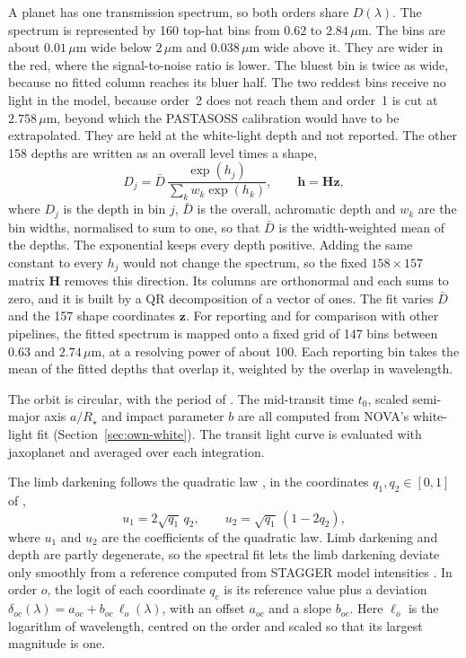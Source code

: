 A planet has one transmission spectrum, so both orders share $D(\lambda)$. The spectrum
is represented by 160 top-hat bins from 0.62 to $2.84\,\mu\mathrm{m}$. The bins
are about $0.01\,\mu\mathrm{m}$ wide below $2\,\mu\mathrm{m}$ and
$0.038\,\mu\mathrm{m}$ wide above it. They are wider in the red, where the
signal-to-noise ratio is lower. The bluest bin is twice as wide, because no fitted column reaches its
bluer half. The two reddest bins receive no light in the model, because order~2 does
not reach them and order~1 is cut at $2.758\,\mu\mathrm{m}$, beyond which the PASTASOSS calibration would have to be extrapolated. They are held at
the white-light depth and not reported. The other 158 depths are written as an
overall level times a shape,
\begin{equation}
  D_j = \bar D\,
  \frac{\exp(h_j)}{\sum_{k} w_k \exp(h_k)}, \qquad \bm{h}=\bm{H}\bm{z},
  \label{eq:depth-basis}
\end{equation}
where $D_j$ is the depth in bin $j$, $\bar D$ is the overall, achromatic depth and $w_k$ are the bin widths,
normalised to sum to one, so that $\bar D$ is the width-weighted mean of the
depths. The exponential keeps every depth positive. Adding the same constant to
every $h_j$ would not change the spectrum, so the fixed $158\times157$ matrix
$\bm{H}$ removes this direction. Its columns are orthonormal and each sums to
zero, and it is built by a QR decomposition of a vector of ones. The fit
varies $\bar D$ and the 157 shape coordinates $\bm{z}$. For reporting and for
comparison with other pipelines, the fitted spectrum is mapped onto a fixed
grid of 147 bins between 0.63 and $2.74\,\mu\mathrm{m}$, at a resolving power
of about 100. Each reporting bin takes the mean of the fitted depths that
overlap it, weighted by the overlap in wavelength.

The orbit is circular, with the period of \citet{LouieEtAl2025}. The
mid-transit time $t_0$, scaled semi-major axis $a/R_\star$ and impact
parameter $b$ are all computed from NOVA's white-light fit
(Section~\ref{sec:own-white}). The
transit light curve is evaluated with jaxoplanet \citep{Jaxoplanet2025} and averaged over
each integration.

The limb darkening follows the quadratic law \citep{MandelAgol2002}, in the
coordinates $q_1,q_2\in[0,1]$ of \citet{Kipping2013},
\begin{equation}
 u_1=2\sqrt{q_1}\,q_2, \qquad
 u_2=\sqrt{q_1}\,(1-2q_2),
 \label{eq:kipping-coordinates}
\end{equation}
where $u_1$ and $u_2$ are the coefficients of the quadratic law. Limb darkening and depth are partly degenerate, so the spectral fit lets the
limb darkening deviate only smoothly from a reference computed from STAGGER
model intensities \citep{MagicEtAl2015}. In order $o$, the logit of each
coordinate $q_c$ is its reference value plus a deviation
$\delta_{oc}(\lambda)=a_{oc}+b_{oc}\,\ell_o(\lambda)$, with an offset $a_{oc}$
and a slope $b_{oc}$. Here $\ell_o$ is the logarithm of wavelength, centred on
the order and scaled so that its largest magnitude is one.


